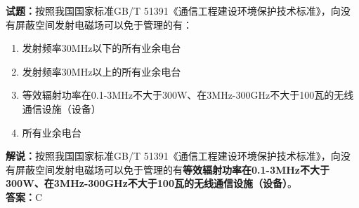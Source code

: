 \documentclass{ctexbook}
\begin{document}
\bigskip


\noindent\textbf{试题：}按照我国国家标准GB/T 51391《通信工程建设环境保护技术标准》，向没有屏蔽空间发射电磁场可以免于管理的有：
\begin{enumerate}[leftmargin=3em]
\item 发射频率30\unit{\MHz}以下的所有业余电台
\item 发射频率30\unit{\MHz}以上的所有业余电台
\item 等效辐射功率在0.1-3\unit{\MHz}不大于300W、在3\unit{\MHz}-300\unit{\GHz}不大于100瓦的无线通信设施（设备）
\item 所有业余电台
\end{enumerate}
\noindent\textbf{解说：}按照我国国家标准GB/T 51391《通信工程建设环境保护技术标准》，向没有屏蔽空间发射电磁场可以免于管理的有\textbf{等效辐射功率在0.1-3\unit{\MHz}不大于300W、在3\unit{\MHz}-300\unit{\GHz}不大于100瓦的无线通信设施（设备）}。\\\textbf{答案：}C



\bigskip


%
%


%
%
%
\end{document}
